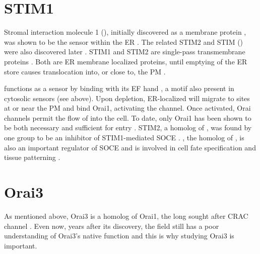  


\section{STIM1}

Stromal interaction molecule 1 (\stim), initially discovered as a membrane protein \citep{Williams2001}, was shown to be the \Ca{} sensor 
within the ER \citep{Roos2005, Liou2005, Zhang2005,Smyth2010}. The related STIM2 and \droso{} STIM (\dstim) were also discovered later \citep{Williams2001}.
STIM1 and STIM2 are single-pass transmembrane proteins \citep{Gwack2007}. Both are ER membrane localized proteins, until emptying of the ER \Ca{} store causes translocation into, or close to, the PM \citep{Gwack2007}.

\stim{} functions as a \Ca{} sensor by binding \Ca{} with its EF hand \citep{Williams2001, Liou2005}, a motif also present in cytosolic \Ca{} sensors (see above). Upon \Ca{} depletion, ER-localized \stim{} will migrate to sites at or near the PM and bind Orai1, activating the channel. 
Once activated, Orai channels permit the flow of \Ca{} into the cell. To date, only Orai1 has been shown to be both necessary and sufficient for \Ca{} entry \citep{Feske2006, Smyth2010}.  
STIM2, a homolog of \stim, was found by one group to be an inhibitor of STIM1-mediated SOCE \citep{Soboloff2006}. 
\dstim, the \droso{} homolog of \stim, is also an important regulator of SOCE and is involved in cell fate specification and tissue patterning \citep{Eid2008}. 

\section{Orai3}
        
As mentioned above, Orai3 is a homolog of Orai1, the long sought after CRAC channel \citep{Feske2006,Gwack2007}. Even now, years after its discovery, the field still has a poor understanding of Orai3's native function and this is why studying Orai3 is important.

